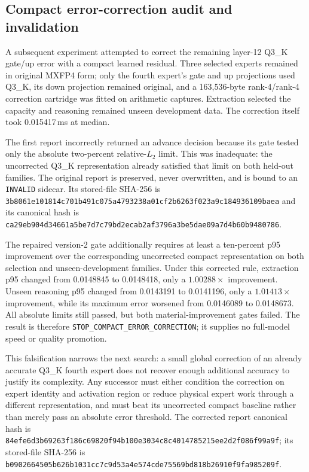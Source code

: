 \subsection{Compact error-correction audit and invalidation}

A subsequent experiment attempted to correct the remaining layer-12 Q3\_K
gate/up error with a compact learned residual.  Three selected experts remained
in original MXFP4 form; only the fourth expert's gate and up projections used
Q3\_K, its down projection remained original, and a 163,536-byte rank-4/rank-4
correction cartridge was fitted on arithmetic captures.  Extraction selected
the capacity and reasoning remained unseen development data.  The correction
itself took 0.015417\,ms at median.

The first report incorrectly returned an advance decision because its gate
tested only the absolute two-percent relative-$L_2$ limit.  This was inadequate:
the uncorrected Q3\_K representation already satisfied that limit on both
held-out families.  The original report is preserved, never overwritten, and
is bound to an \texttt{INVALID} sidecar.  Its stored-file SHA-256 is
\texttt{3b8061e101814c701b491c075a4793238a01cf2b6263f023a9c184936109baea}
and its canonical hash is
\texttt{ca29eb904d34661a5be7d7c79bd2ecab2af3796a3be5dae09a7d4b60b9480786}.

The repaired version-2 gate additionally requires at least a ten-percent p95
improvement over the corresponding uncorrected compact representation on both
selection and unseen-development families.  Under this corrected rule,
extraction p95 changed from 0.0148845 to 0.0148418, only a
$1.00288\times$ improvement.  Unseen reasoning p95 changed from 0.0143191 to
0.0141196, only a $1.01413\times$ improvement, while its maximum error worsened
from 0.0146089 to 0.0148673.  All absolute limits still passed, but both
material-improvement gates failed.  The result is therefore
\texttt{STOP\_COMPACT\_ERROR\_CORRECTION}; it supplies no full-model speed or
quality promotion.

This falsification narrows the next search: a small global correction of an
already accurate Q3\_K fourth expert does not recover enough additional
accuracy to justify its complexity.  Any successor must either condition the
correction on expert identity and activation region or reduce physical expert
work through a different representation, and must beat its uncorrected compact
baseline rather than merely pass an absolute error threshold.  The corrected
report canonical hash is
\texttt{84efe6d3b69263f186c69820f94b100e3034c8c4014785215ee2d2f086f99a9f};
its stored-file SHA-256 is
\texttt{b0902664505b626b1031cc7c9d53a4e574cde75569bd818b26910f9fa985209f}.
